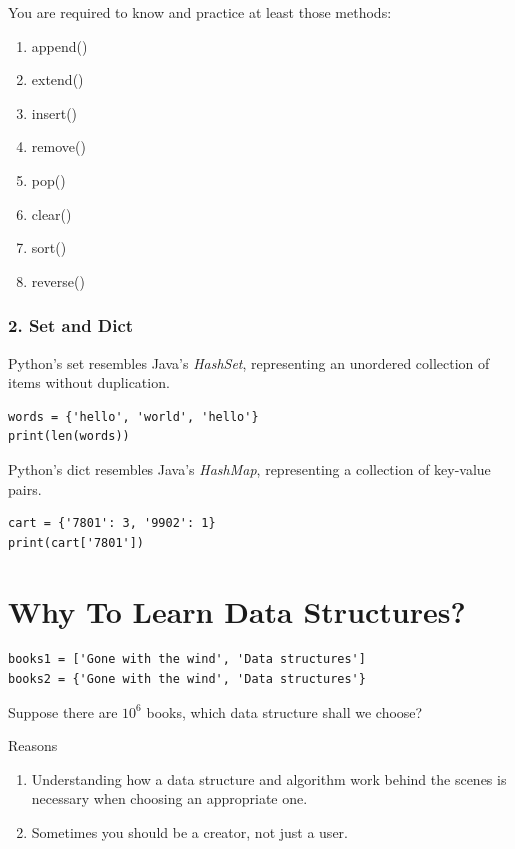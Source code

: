 \documentclass[aspectratio=169, 14pt]{beamer}
\begin{document}
\begin{frame}
You are required to know and practice at least those methods:
\begin{enumerate}
    \item append()
    \item extend()
    \item insert()
    \item remove()
    \item pop()
    \item clear()
    \item sort()
    \item reverse()
\end{enumerate}    

\end{frame}

\begin{frame}[fragile]
    \frametitle{2. Set and Dict}
Python's \alert{set} resembles Java's \emph{HashSet}, representing an unordered collection of items without duplication.
\begin{verbatim}
words = {'hello', 'world', 'hello'}
print(len(words))    
\end{verbatim}
\pause
Python's \alert{dict} resembles Java's \emph{HashMap}, representing a collection of key-value pairs.
\begin{verbatim}
cart = {'7801': 3, '9902': 1}
print(cart['7801'])    
\end{verbatim}
\end{frame}


\section{\textcolor{darkmidnightblue}{Why To Learn Data Structures?}}

\begin{frame}[fragile]
\begin{verbatim}
books1 = ['Gone with the wind', 'Data structures']
books2 = {'Gone with the wind', 'Data structures'}
\end{verbatim}

Suppose there are $10^6$ books, which data structure shall we choose?

\pause

\begin{block}{Reasons}
    \begin{enumerate}
        \item Understanding how a data structure and algorithm work behind the scenes is necessary when choosing an appropriate one.
        \item Sometimes you should be a creator, not just a user.
    \end{enumerate}
\end{block}
\end{frame}
\end{document}
